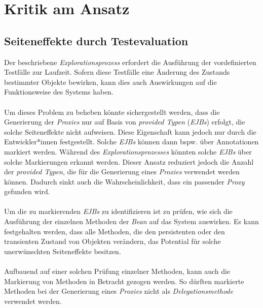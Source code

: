 \section{Kritik am Ansatz}\label{sec_discApproach}

\subsection{Seiteneffekte durch Testevaluation}\label{sec_sideeffects}
Der beschriebene \emph{Explorationsprozess} erfordert die Ausführung der vordefinierten Testfälle zur Laufzeit. Sofern diese Testfälle eine Änderung des Zustands bestimmter Objekte bewirken, kann dies auch Auswirkungen auf die Funktionsweise des Systems haben. 
\\\\
Um dieses Problem zu beheben könnte sichergestellt werden, dass die Generierung der \emph{Proxies} nur auf Basis von \emph{provided Typen} (\emph{EJBs}) erfolgt, die solche Seiteneffekte nicht aufweisen. Diese Eigenschaft kann jedoch nur durch die Entwickler*innen festgestellt. Solche \emph{EJBs} können dann bspw. über Annotationen markiert werden. Während des \emph{Explorationsprozesses} könnten solche \emph{EJBs} über solche Markierungen erkannt werden. Dieser Ansatz reduziert jedoch die Anzahl der \emph{provided Typen}, die für die Generierung eines \emph{Proxies} verwendet werden können. Dadurch sinkt auch die Wahrscheinlichkeit, dass ein passender \emph{Proxy} gefunden wird.
\\\\
Um die zu markierenden \emph{EJBs} zu identifizieren ist zu prüfen, wie sich die Ausführung der einzelnen Methoden der \emph{Bean} auf das System auswirken. Es kann festgehalten werden, dass alle Methoden, die den persistenten oder den transienten Zustand von Objekten verändern, das Potential für solche unerwünschten Seiteneffekte besitzen. 
\\\\
Aufbauend auf einer solchen Prüfung einzelner Methoden, kann auch die Markierung von Methoden in Betracht gezogen werden. So dürften markierte Methoden bei der Generierung eines \emph{Proxies} nicht als \emph{Delegationsmethode} verwendet werden.
